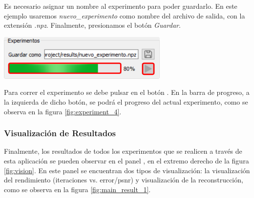 \documentclass[12pt,twoside,letter]{ol-softwaremanual}
\newcommand*\circled[1]{\tikz[baseline=(char.base)]{
            \node[shape=circle,draw,inner sep=2pt] (char) {#1};}}
\newenvironment{Figure}
  {\par\medskip\noindent\minipage{\linewidth}}
  {\endminipage\par\medskip}
\begin{document}
Es necesario asignar un nombre al experimento para poder guardarlo. En este ejemplo usaremos \emph{nuevo\_experimento} como nombre del archivo de salida, con la extensión \emph{.npz}. Finalmente, presionamos el botón \emph{Guardar}.

\begin{multicols}{2}

\begin{Figure}
	\centering
	\includegraphics[width=0.7\linewidth]{experiment-4.png}
	\label{fig:experiment_4}
\end{Figure}

Para correr el experimento se debe pulsar en el botón \hspace{0.5mm} \faPlay \hspace{0.5mm}. En la barra de progreso, a la izquierda de dicho botón, se podrá el progreso del actual experimento, como se observa en la figura \ref{fig:experiment_4}.

\end{multicols}

\subsubsection{Visualización de Resultados}

Finalmente, los resultados de todos los experimentos que se realicen a través de esta aplicación se pueden observar en el panel \circled{7}, en el extremo derecho de la figura \ref{fig:vision}. En este panel se encuentran dos tipos de visualización: la visualización del rendimiento (iteraciones vs. error/psnr) y visualización de la reconstrucción, como se observa en la figura \ref{fig:main_result_1}.
\end{document}
